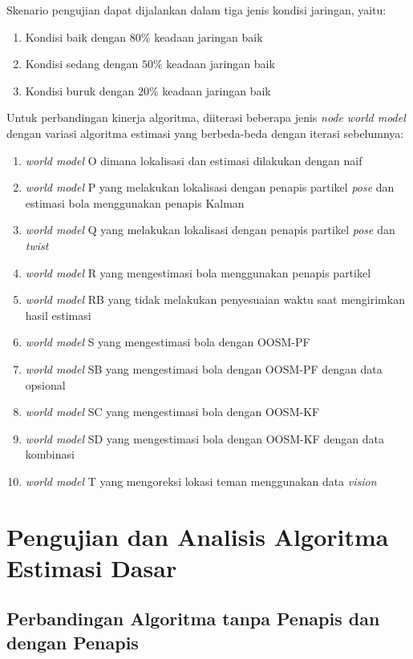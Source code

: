 Skenario pengujian dapat dijalankan dalam tiga jenis kondisi jaringan, yaitu:
\begin{enumerate}
    \item Kondisi baik dengan $80\%$ keadaan jaringan baik
    \item Kondisi sedang dengan $50\%$ keadaan jaringan baik
    \item Kondisi buruk dengan $20\%$ keadaan jaringan baik
\end{enumerate}

Untuk perbandingan kinerja algoritma, diiterasi beberapa jenis \textit{node} \textit{world model} dengan variasi algoritma estimasi yang berbeda-beda dengan iterasi sebelumnya:
\begin{enumerate}
    \item \textit{world model} O dimana lokalisasi dan estimasi dilakukan dengan naif
    \item \textit{world model} P yang melakukan lokalisasi dengan penapis partikel \textit{pose} dan estimasi bola menggunakan penapis Kalman
    \item \textit{world model} Q yang melakukan lokalisasi dengan penapis partikel \textit{pose} dan \textit{twist}
    \item \textit{world model} R yang mengestimasi bola menggunakan penapis partikel
    \item \textit{world model} RB yang tidak melakukan penyesuaian waktu saat mengirimkan hasil estimasi
    \item \textit{world model} S yang mengestimasi bola dengan OOSM-PF
    \item \textit{world model} SB yang mengestimasi bola dengan OOSM-PF dengan data opsional
    \item \textit{world model} SC yang mengestimasi bola dengan OOSM-KF
    \item \textit{world model} SD yang mengestimasi bola dengan OOSM-KF dengan data kombinasi
    \item \textit{world model} T yang mengoreksi lokasi teman menggunakan data \textit{vision}
\end{enumerate}

\section{Pengujian dan Analisis Algoritma Estimasi Dasar}

\subsection{Perbandingan Algoritma tanpa Penapis dan dengan Penapis}

